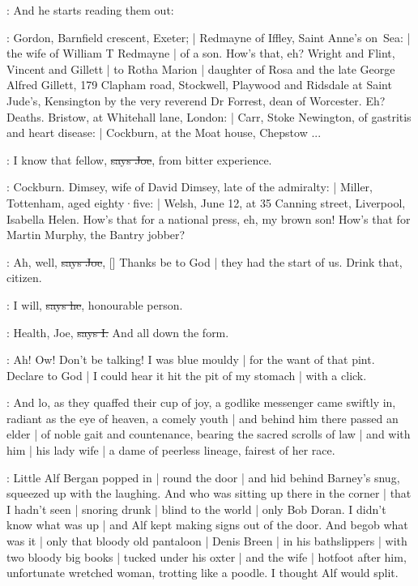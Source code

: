 \Nq:
And he starts reading them out:

\citizen:
Gordon,
Barnfield crescent,
Exeter; |
Redmayne of Iffley,
Saint Anne's on~Sea: |
the wife of William T Redmayne |
of a son.
How's that,
eh?
Wright and Flint,
Vincent and Gillett |
to Rotha Marion |
daughter of Rosa and the late George Alfred Gillett,
179 Clapham road,
Stockwell,
Playwood and Ridsdale at Saint Jude's,
Kensington by the very reverend Dr Forrest,
dean of Worcester.
Eh?
Deaths.
Bristow,
at Whitehall lane,
London: |
Carr,
Stoke Newington,
of gastritis and heart disease: |
Cockburn,
at the Moat house,
Chepstow ...

\joe:
I know that fellow,
\sout{says Joe},
from bitter experience.

\citizen:
Cockburn.
Dimsey,
wife of David Dimsey,
late of the admiralty: |
Miller,
Tottenham,
aged eighty·five: |
Welsh,
June 12,
at 35 Canning street,
Liverpool,
Isabella Helen.
How's that for a national press,
eh,
my brown son!
How's that for Martin Murphy,
the Bantry jobber?

\joe:
Ah, well,
\sout{says Joe},
[]
Thanks be to God |
they had the start of us.
Drink that,
citizen.

\citizen:
I will,
\sout{says he},
honourable person.

:
Health,
Joe,
\sout{says I.}
And all down the form.

\Nq:
Ah!
Ow!
Don't be talking!
I was blue mouldy |
for the want of that pint.
Declare to God |
I could hear it hit the pit of my stomach |
with a click.

:
And lo,
as they quaffed their cup of joy,
a godlike messenger came swiftly in,
radiant as the eye of heaven,
a comely youth |
and behind him
there passed an elder |
of noble gait and countenance,
bearing the sacred scrolls of law |
and with him |
his lady wife |
a dame of peerless lineage,
fairest of her race.

\Nq:
Little Alf Bergan popped in |
round the door |
and hid behind Barney's snug,
squeezed up with the laughing.
And who was sitting up there in the corner |
that I hadn't seen |
snoring drunk |
blind to the world |
only Bob Doran.
I didn't know what was up |
and Alf kept making signs out of the door.
And begob what was it |
only that bloody old pantaloon |
Denis Breen |
in his bathslippers |
with two bloody big books |
tucked under his oxter |
and the wife |
hotfoot after him,
unfortunate wretched woman,
trotting like a poodle.
I thought Alf would split.

